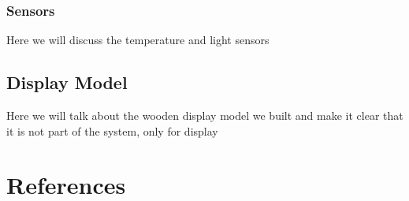 \documentclass[12pt,a4paper]{report}
\begin{document}
\subsubsection{Sensors}
Here we will discuss the temperature and light sensors

\subsection{Display Model}
Here we will talk about the wooden display model we built and make it clear that it is not part of the system, only for display









\setcounter{section}{8}
\section{References}
\begingroup
   \def\chapter*#1{}
   
	
\endgroup	

 
\end{document}
